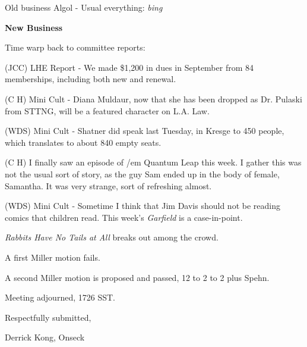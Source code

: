 Old business Algol - Usual everything: {\em bing\/}

\vspace{0.15in}
{\bf New Business}

Time warp back to committee reports:

(JCC) LHE Report - We made \$1,200 in dues in September from 84
memberships, including both new and renewal.

(C H) Mini Cult - Diana Muldaur, now that she has been dropped as Dr.
Pulaski from STTNG, will be a featured character on L.A. Law.

(WDS) Mini Cult - Shatner did speak last Tuesday, in Kresge to 450
people, which translates to about 840 empty seats.

(C H) I finally saw an episode of {/em Quantum Leap} this week.  I
gather this was not the usual sort of story, as the guy Sam ended up
in the body of female, Samantha.  It was very strange, sort of
refreshing almost.

(WDS) Mini Cult - Sometime I think that Jim Davis should not be
reading comics that children read.  This week's {\em Garfield} is a
case-in-point.

{\em Rabbits Have No Tails at All} breaks out among the crowd.

A first Miller motion fails.

A second Miller motion is proposed and passed, 12 to 2 to 2 plus
Spehn.

Meeting adjourned, 1726 SST.

\vspace{0.15in}
\begin{center}
Respectfully submitted,

Derrick Kong, Onseck
\end{center}

